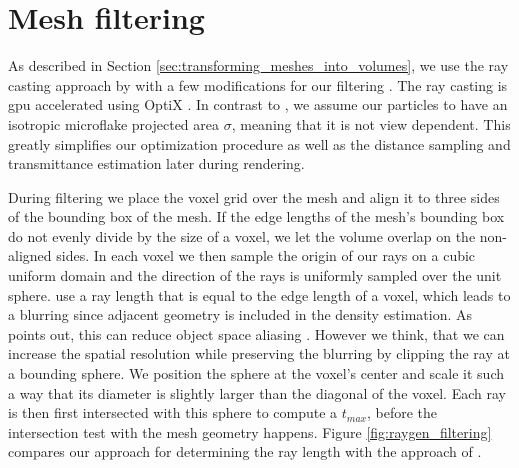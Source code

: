 \section{Mesh filtering}
\label{sec:mesh_filtering}
As described in Section \ref{sec:transforming_meshes_into_volumes}, we use the ray casting approach by \citeauthor{hybrid_mesh_volume_lods} with a few modifications for our filtering \cite{hybrid_mesh_volume_lods}.
The ray casting is \ac{gpu} accelerated using OptiX \cite{parker_optix}.
In contrast to \citeauthor{hybrid_mesh_volume_lods}, we assume our particles to have an isotropic microflake projected area $\sigma$, meaning that it is not view dependent.
This greatly simplifies our optimization procedure as well as the distance sampling and transmittance estimation later during rendering.

During filtering we place the voxel grid over the mesh and align it to three sides of the bounding box of the mesh.
If the edge lengths of the mesh's bounding box do not evenly divide by the size of a voxel, we let the volume overlap on the non-aligned sides.
In each voxel we then sample the origin of our rays on a cubic uniform domain and the direction of the rays is uniformly sampled over the unit sphere.
\citeauthor{hybrid_mesh_volume_lods} use a ray length that is equal to the edge length of a voxel, which leads to a blurring since adjacent geometry is included in the density estimation.
As \citeauthor{wang_object_space_aliasing} points out, this can reduce object space aliasing \cite{wang_object_space_aliasing}.
However we think, that we can increase the spatial resolution while preserving the blurring by clipping the ray at a bounding sphere.
We position the sphere at the voxel's center and scale it such a way that its diameter is slightly larger than the diagonal of the voxel.
Each ray is then first intersected with this sphere to compute a $t_{max}$, before the intersection test with the mesh geometry happens.
Figure \ref{fig:raygen_filtering} compares our approach for determining the ray length with the approach of \citeauthor{hybrid_mesh_volume_lods}.
